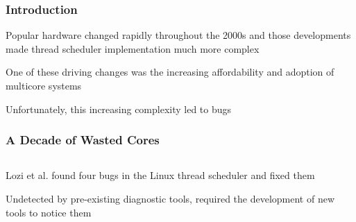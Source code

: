 \documentclass{beamer}
\newcommand{\linespace}{\vskip 0.25cm}
\begin{document}
\begin{frame}
\frametitle{Introduction}

Popular hardware changed rapidly throughout the 2000s and those developments made thread scheduler implementation much more complex

\linespace

One of these driving changes was the increasing affordability and adoption of multicore systems

\linespace

Unfortunately, this increasing complexity led to bugs

\end{frame}

\begin{frame}
\frametitle{A Decade of Wasted Cores}

\begin{columns}
\begin{column}{0.72\textwidth}
Lozi et al. found four bugs in the Linux thread scheduler and fixed them~\cite{Lozi:2016}

\linespace

Undetected by pre-existing diagnostic tools, required the development of new tools to notice them


\end{column}
\end{columns}
\end{frame}
\end{document}
